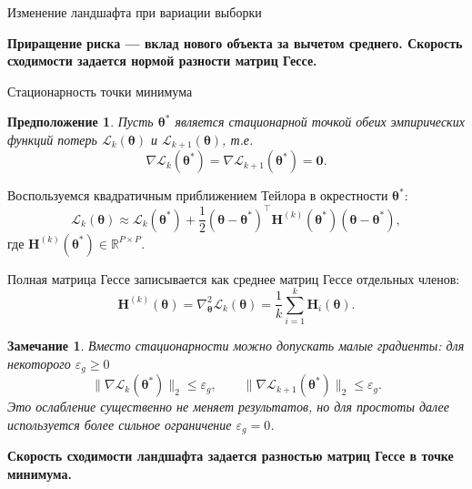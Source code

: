 \documentclass[9pt,pdf,hyperref={unicode}]{beamer}
\newtheorem{rusassumption}{Предположение}
\newtheorem{rusremark}{Замечание}
\newcommand{\key}[1]{\par\vspace{0.5ex}\noindent\textbf{\color{darkgreen}#1}}
\begin{document}
\begin{frame}{Изменение ландшафта при вариации выборки}
\key{Приращение риска --- вклад нового объекта за вычетом среднего. Скорость сходимости задается нормой разности матриц Гессе.}
\end{frame}
\begin{frame}{Стационарность точки минимума}
\justifying
\footnotesize
\begin{rusassumption}
    Пусть $\boldsymbol{\theta}^*$ является стационарной точкой обеих эмпирических функций потерь $\mathcal{L}_{k}(\boldsymbol{\theta})$ и $\mathcal{L}_{k+1}(\boldsymbol{\theta})$, т.е.
    \[
        \nabla \mathcal{L}_{k}(\boldsymbol{\theta}^*) = \nabla \mathcal{L}_{k+1}(\boldsymbol{\theta}^*) = \mathbf{0}.
    \]
\end{rusassumption}

Воспользуемся квадратичным приближением Тейлора в окрестности $\boldsymbol{\theta}^*$:
\[
    \mathcal{L}_k(\boldsymbol{\theta})\approx\mathcal{L}_k(\boldsymbol{\theta}^*)+\frac12(\boldsymbol{\theta}-\boldsymbol{\theta}^*)^\top\mathbf{H}^{(k)}(\boldsymbol{\theta}^*)(\boldsymbol{\theta}-\boldsymbol{\theta}^*),
\]
где $\mathbf{H}^{(k)}(\boldsymbol{\theta}^*)\in\mathbb{R}^{P\times P}$.

Полная матрица Гессе записывается как среднее матриц Гессе отдельных членов:
\[
    \mathbf{H}^{(k)}(\boldsymbol{\theta})=\nabla^2_{\boldsymbol{\theta}}\mathcal{L}_{k}(\boldsymbol{\theta})=\frac{1}{k}\sum_{i=1}^{k}\mathbf{H}_{i}(\boldsymbol{\theta}).
\]
\begin{rusremark}
    Вместо стационарности можно допускать малые градиенты: для некоторого $\varepsilon_g\ge 0$
    \[
        \bigl\|\nabla \mathcal{L}_k(\boldsymbol{\theta}^*)\bigr\|_2 \le \varepsilon_g,\qquad
        \bigl\|\nabla \mathcal{L}_{k+1}(\boldsymbol{\theta}^*)\bigr\|_2 \le \varepsilon_g .
    \]
    Это ослабление существенно не меняет результатов, но для простоты далее используется более сильное ограничение $\varepsilon_g=0$.
\end{rusremark}
\key{Скорость сходимости ландшафта задается разностью матриц Гессе в точке минимума.}
\end{frame}
\end{document}
